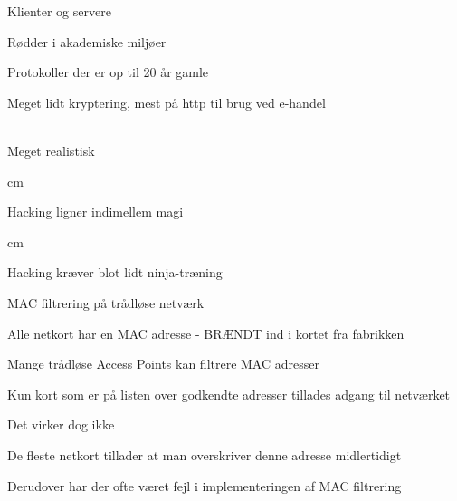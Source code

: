 \documentclass[20pt,landscape,a4paper,footrule]{foils}
\begin{document}
\begin{list1}
\item Klienter og servere
\item Rødder i akademiske miljøer
\item Protokoller der er op til 20 år gamle
\item Meget lidt kryptering, mest på http til brug ved e-handel 
\end{list1}


\\
Meget realistisk 





 cm

\centerline{Hacking ligner indimellem  magi}




 cm
\centerline{Hacking kræver blot lidt ninja-træning}


\begin{list1}
\item MAC filtrering på trådløse netværk
\item Alle netkort har en MAC adresse - BRÆNDT ind i kortet fra fabrikken
\item Mange trådløse Access Points kan filtrere MAC adresser
\item Kun kort som er på listen over godkendte adresser tillades adgang til netværket
\pause
\item Det virker dog ikke \smiley
\item De fleste netkort tillader at man overskriver denne adresse midlertidigt
\item Derudover har der ofte været fejl i implementeringen af MAC filtrering
\end{list1}

\end{document}
